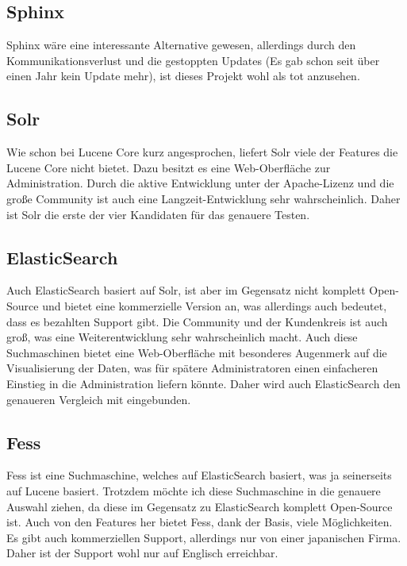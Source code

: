 \subsection{Sphinx}

Sphinx wäre eine interessante Alternative gewesen, allerdings durch den Kommunikationsverlust und die gestoppten Updates (Es gab schon seit über einen Jahr kein Update mehr), ist dieses Projekt wohl als tot anzusehen. \cite{SphinxTechnologiesInc.2019}

\subsection{Solr}

Wie schon bei Lucene Core kurz angesprochen, liefert Solr viele der Features die Lucene Core nicht bietet. Dazu besitzt es eine Web-Oberfläche zur Administration. Durch die aktive Entwicklung unter der Apache-Lizenz und die große Community ist auch eine Langzeit-Entwicklung sehr wahrscheinlich. Daher ist Solr die erste der vier Kandidaten für das genauere Testen. \cite{TheApacheSoftwareFoundation.2019}

\subsection{ElasticSearch}

Auch ElasticSearch basiert auf Solr, ist aber im Gegensatz nicht komplett Open-Source und bietet eine kommerzielle Version an, was allerdings auch bedeutet, dass es bezahlten Support gibt. Die Community und der Kundenkreis ist auch groß, was eine Weiterentwicklung sehr wahrscheinlich macht. Auch diese Suchmaschinen bietet eine Web-Oberfläche mit besonderes Augenmerk auf die Visualisierung der Daten, was für spätere Administratoren einen einfacheren Einstieg in die Administration liefern könnte. Daher wird auch ElasticSearch den genaueren Vergleich mit eingebunden.

\subsection{Fess}

Fess ist eine Suchmaschine, welches auf ElasticSearch basiert, was ja seinerseits auf Lucene basiert. Trotzdem möchte ich diese Suchmaschine in die genauere Auswahl ziehen, da diese im Gegensatz zu ElasticSearch komplett Open-Source ist. Auch von den Features her bietet Fess, dank der Basis, viele Möglichkeiten. Es gibt auch kommerziellen Support, allerdings nur von einer japanischen Firma. Daher ist der Support wohl nur auf Englisch erreichbar.

